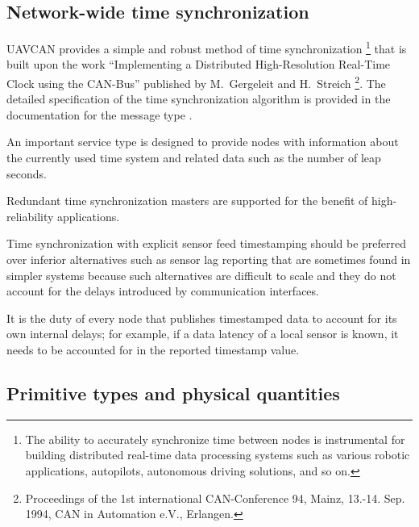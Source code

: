 
\subsection{Network-wide time synchronization}

UAVCAN provides a simple and robust method of time synchronization%
\footnote{The ability to accurately synchronize time between nodes is instrumental for building distributed
real-time data processing systems such as various robotic applications, autopilots, autonomous driving solutions,
and so on.} that is built upon the work
``Implementing a Distributed High-Resolution Real-Time Clock using the CAN-Bus''
published by M.~Gergeleit and H.~Streich%
\footnote{Proceedings of the 1st international CAN-Conference 94, Mainz,
13.-14. Sep. 1994, CAN in Automation e.V., Erlangen.}.
The detailed specification of the time synchronization algorithm is provided in the documentation
for the message type .

An important service type 
is designed to provide nodes with information about the currently used time system
and related data such as the number of leap seconds.

Redundant time synchronization masters are supported for the benefit of high-reliability applications.

\begin{remark}
      Time synchronization with explicit sensor feed timestamping should be preferred over inferior alternatives
      such as sensor lag reporting that are sometimes found in simpler systems because such alternatives
      are difficult to scale and they do not account for the delays introduced by communication interfaces.

      It is the duty of every node that publishes timestamped data to account for its own internal delays;
      for example, if a data latency of a local sensor is known,
      it needs to be accounted for in the reported timestamp value.
\end{remark}


\subsection{Primitive types and physical quantities}

